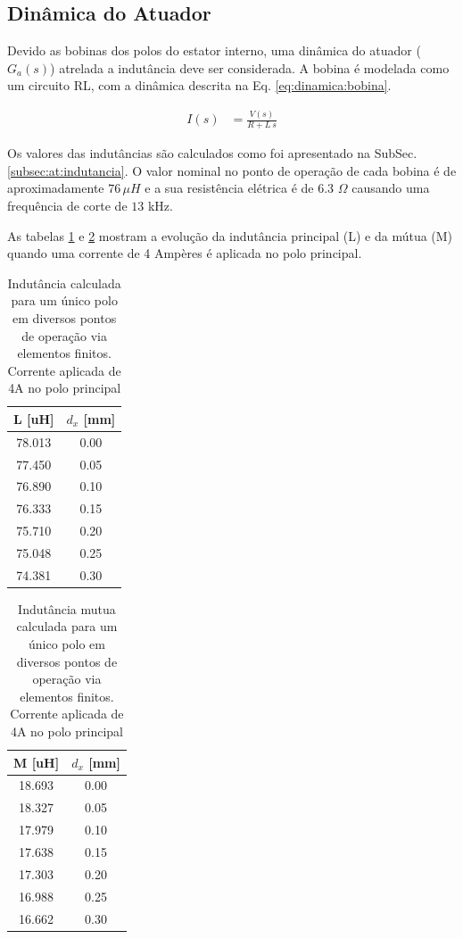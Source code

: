 \subsection{Dinâmica do Atuador}

Devido as bobinas dos polos do estator interno, uma dinâmica do atuador ($G_a(s)$) atrelada a indutância deve ser considerada. A bobina é modelada como um circuito RL, com a dinâmica descrita na Eq. \eqref{eq:dinamica:bobina}.

\begin{align}
	I(s) &= \frac{V(s)}{R + L \, s} 
	\label{eq:dinamica:bobina}
\end{align}

Os valores das indutâncias são calculados como foi apresentado na SubSec. \ref{subsec:at:indutancia}. O valor nominal no ponto de operação de cada bobina é de aproximadamente $76 \, \mu H$ e a sua resistência elétrica é de 6.3 $\Omega$ causando uma frequência de corte de $13$ kHz. 

As tabelas \ref{tab:dinamica:indutancia} e \ref{tab:dinamica:indutancia:mutua} mostram a evolução da indutância principal (L) e da mútua (M) quando uma corrente de 4 Ampères é aplicada no polo principal. 

\begin{table}[ht!]
	\centering
	\begin{tabular}{c c}
        L [uH]  & $d_x$ [mm] \\
        \hline \hline               
        78.013 & 0.00 \\
        77.450 & 0.05 \\
        76.890 & 0.10 \\
        76.333 & 0.15 \\
        75.710 & 0.20 \\
        75.048 & 0.25 \\
        74.381 & 0.30       
	\end{tabular} 
	\caption{Indutância calculada para um único polo em diversos pontos de operação via elementos finitos. Corrente aplicada de 4A no polo principal}
	\label{tab:dinamica:indutancia} 
\end{table} 

\begin{table}[ht!]
	\centering
	\begin{tabular}{c c}
        M [uH]  & $d_x$ [mm] \\
        \hline \hline               
         18.693 & 0.00 \\
         18.327 & 0.05 \\
         17.979 & 0.10 \\
         17.638 & 0.15 \\
         17.303 & 0.20 \\
         16.988 & 0.25 \\
         16.662 & 0.30       
	\end{tabular} 
	\caption{Indutância mutua calculada para um único polo em diversos pontos de operação via elementos finitos. Corrente aplicada de 4A no polo principal}
	\label{tab:dinamica:indutancia:mutua} 
\end{table} 

